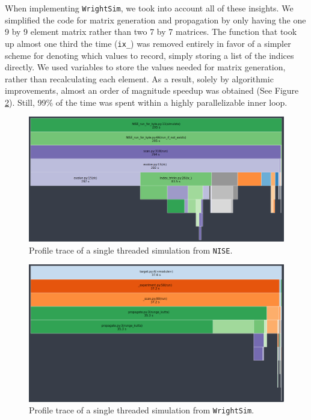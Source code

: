 When implementing \texttt{WrightSim}, we took into account all of these
insights. We simplified the code for matrix generation and propagation
by only having the one 9 by 9 element matrix rather than two 7 by 7
matrices. The function that took up almost one third the time
(\texttt{ix\_}) was removed entirely in favor of a simpler scheme for
denoting which values to record, simply storing a list of the indices
directly. We used variables to store the values needed for matrix
generation, rather than recalculating each element. As a result, solely
by algorithmic improvements, almost an order of magnitude speedup was
obtained (See Figure \ref{sim:fig:snakeviz2}). Still, 99\% of the time
was spent within a highly parallelizable inner loop.

\begin{landscape}
\begin{figure}
\centering
	\includegraphics[width=8in]{simulation/images/NISE_prof.png}
\caption{Profile trace of a single threaded simulation from
\texttt{NISE}. \label{sim:fig:snakeviz}}
\end{figure}
\end{landscape}

\begin{landscape}
\begin{figure}
\centering
	\includegraphics[width=8in]{simulation/images/WrightSim_prof.png}
\caption{Profile trace of a single threaded simulation from
\texttt{WrightSim}. \label{sim:fig:snakeviz2}}
\end{figure}
\end{landscape}

